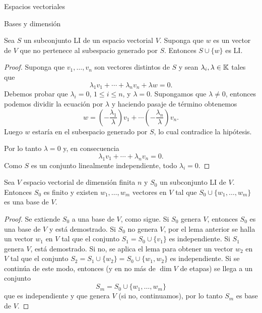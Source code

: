 \begin{chapter}{Espacios vectoriales}
\begin{section}{Bases y dimensi\'on}
    \begin{lema}\label{lem-li+vec=li}
        Sea $S$ un subconjunto LI de un espacio vectorial $V$. Suponga que $w$ es un vector de $V$ que no pertenece al subespacio generado por $S$. Entonces $S \cup \{w\}$ es LI.
    \end{lema}
    \begin{proof}
        Suponga que $v_1,\ldots,v_n$  son vectores distintos de $S$ y sean $\lambda_i,\lambda \in \mathbb K$  tales que
        \begin{equation}\label{eq-dep-lin}
            \lambda_1 v_1 + \cdots + \lambda_n v_n + \lambda w =0 .
        \end{equation}
        Debemos probar que $\lambda_i=0$, $1 \le i \le n$, y $\lambda =0$.
        Supongamos que $\lambda \ne 0$, entonces podemos dividir la ecuación por $\lambda$ y haciendo  pasaje de término  obtenemos
        $$
        w = \left(-\frac{\lambda_1}{\lambda}\right) v_1 + \cdots   \left(-\frac{\lambda_n}{\lambda}\right) v_n.
        $$
        Luego $w$ estaría  en el subespacio generado por $S$, lo cual contradice la hipótesis. 
        
        Por  lo tanto $\lambda =0$ y, en consecuencia  
        $$
        \lambda_1 v_1 + \cdots + \lambda_n v_n =0.
        $$ 
        Como $S$ es un conjunto linealmente independiente, todo $\lambda_i = 0$. 
    \end{proof}



    \begin{teorema}\label{completar-bases}
    Sea $V$ espacio vectorial de dimensión finita $n$ y $S_0$ un subconjunto LI de $V$. Entonces $S_0$  es finito  y existen $w_1,\ldots,w_m$ vectores en  $V$ tal que  $S_0 \cup \{w_1,\ldots,w_m\}$ es una base de $V$. 
\end{teorema}
\begin{proof}
    Se extiende $S_0$ a una base de $V$, como sigue. Si $S_0$ genera $V$, entonces $S_0$ es una base de $V$ y está demostrado. Si $S_0$ no genera $V$, por el lema anterior se halla un vector $w_1$ en $V$ tal que el conjunto $S_1 = S_0 \cup \{v_1\}$ es independiente.			
    Si $S_1$ genera $V$, está demostrado. Si no, se aplica el lema para obtener un vector $w_2$ en $V$ tal que el conjunto $S_2 = S_1 \cup \{w_2\} = S_0 \cup \{w_1,w_2\}$ es independiente. Si se continúa de este modo, entonces (y en no más de $\dim V$ de etapas) se llega a un conjunto 
    $$
    S_m =  S_0 \cup \{w_1,\ldots,w_m\}
    $$
    que es independiente y que genera $V$ (si no, continuamos), por lo tanto $S_m$ es base de $V$. 
\end{proof}


\end{section}
\end{chapter}
